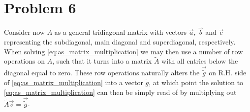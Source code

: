 \documentclass[english,notitlepage,reprint,nofootinbib]{revtex4-2}  %
\begin{document}
\section{Problem 6}
Consider now $A$ as a general tridiagonal matrix with vectors $\vec{a}, \ \vec{b}$ and \(\vec{c}\) representing the subdiagonal, main diagonal and superdiagonal, respectively. When solving \eqref{eq:as_matrix_multiplication} we may then use a number of row operations on $A$, such that it turns into a matrix $\tilde{A}$ with all entries below the diagonal equal to zero. These row operations naturally alters the $\vec{\tilde{g}}$ on R.H. side of \eqref{eq:as_matrix_multiplication} into a vector $\tilde{g}$, at which point the solution to \eqref{eq:as_matrix_multiplication} can then be simply read of by multiplying out $\tilde{A}\vec{v} = \vec{\tilde{g}}$.
\end{document}
